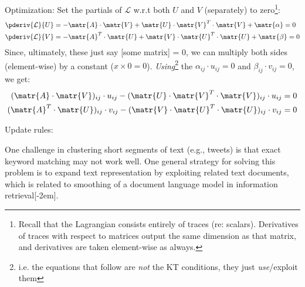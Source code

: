 \documentclass[11pt]{article}
\begin{document}
\begin{compactitem}
	\item Optimization: Set the partials of $\mathcal{L}$ w.r.t both $U$ and $V$ (separately) to zero\footnote{Recall that the Lagrangian consists entirely of traces (re: scalars). Derivatives of traces with respect to matrices output the same dimension as that matrix, and derivatives are taken element-wise as always.}:
	\begin{align}
		\pderiv{\mathcal{L}}{U} &= - \matr{A} \cdot \matr{V} 
			+ \matr{U} \cdot \matr{V}^T \cdot \matr{V}
			+ \matr{\alpha} = 0 \\
		\pderiv{\mathcal{L}}{V} &= - \matr{A}^T \cdot \matr{U} 
		+ \matr{V} \cdot \matr{U}^T \cdot \matr{U}
		+ \matr{\beta} = 0
	\end{align} 
	Since, ultimately, these just say [some matrix] = 0, we can multiply both sides (element-wise) by a constant ($x \times 0 = 0$). \textit{Using}\footnote{i.e. the equations that follow are \textit{not} the KT conditions, they just \textit{use}/exploit them\textellipsis} the  $\alpha_{ij} \cdot u_{ij} = 0$ and
	$\beta_{ij} \cdot v_{ij} = 0$, we get:
	\begin{align}
		(\matr{A} \cdot \matr{V})_{ij} \cdot u_{ij}
			- (\matr{U} \cdot \matr{V}^T \cdot \matr{V})_{ij} \cdot u_{ij}
			 &= 0 \\
		(\matr{A}^T \cdot \matr{U} )_{ij} \cdot v_{ij}
			- (\matr{V} \cdot \matr{U}^T \cdot \matr{U})_{ij} \cdot v_{ij}
		&= 0
	\end{align}
	
	\item Update rules:
\end{compactitem}

\myspace{}
\myspace

\p One challenge in clustering short segments of text (e.g., tweets) is that exact keyword matching may not work well. One general strategy for solving this problem is to expand text representation by exploiting related text documents, which is related to smoothing of a document language model in information retrieval[-2em].
\end{document}

